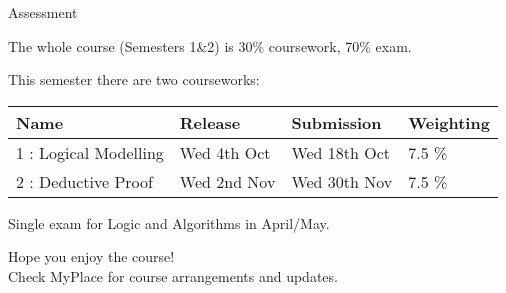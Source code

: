 \documentclass[xetex,aspectratio=169,14pt,hyperref={pdfpagelabels=true,pdflang={en-GB}}]{beamer}
\begin{document}
\begin{frame}
  {Assessment}

  The whole course (Semesters 1\&2) is 30\% coursework, 70\% exam.

  \bigskip

  This semester there are two courseworks:
  \begin{center}
    \begin{tabular}{llll}
      Name & Release & Submission & Weighting\\
      \hline
      1 : Logical Modelling &Wed 4th Oct &Wed 18th Oct &7.5 \% \\
      2 : Deductive Proof   &Wed 2nd Nov &Wed 30th Nov &7.5 \%\\
    \end{tabular}
  \end{center}

  \bigskip

  Single exam for Logic and Algorithms in April/May.
\end{frame}

\begin{frame}
  \begin{center}
    {\Huge Hope you enjoy the course!} \\
    Check MyPlace for course arrangements and updates.
  \end{center}
\end{frame}
\end{document}
